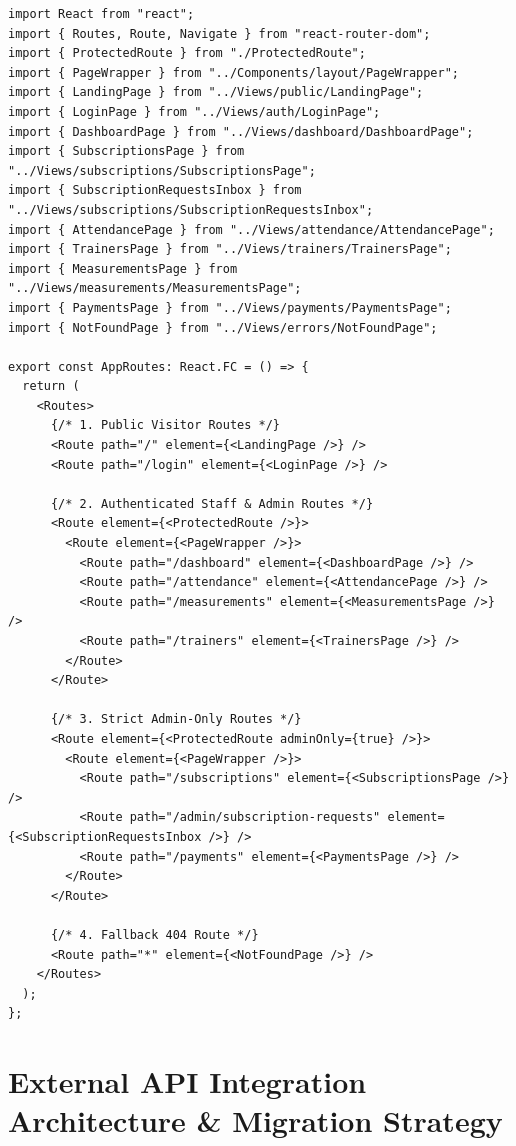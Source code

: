 \documentclass[11pt,a4paper]{article}
\begin{document}
\begin{lstlisting}[caption={Routing/routes.tsx}]
import React from "react";
import { Routes, Route, Navigate } from "react-router-dom";
import { ProtectedRoute } from "./ProtectedRoute";
import { PageWrapper } from "../Components/layout/PageWrapper";
import { LandingPage } from "../Views/public/LandingPage";
import { LoginPage } from "../Views/auth/LoginPage";
import { DashboardPage } from "../Views/dashboard/DashboardPage";
import { SubscriptionsPage } from "../Views/subscriptions/SubscriptionsPage";
import { SubscriptionRequestsInbox } from "../Views/subscriptions/SubscriptionRequestsInbox";
import { AttendancePage } from "../Views/attendance/AttendancePage";
import { TrainersPage } from "../Views/trainers/TrainersPage";
import { MeasurementsPage } from "../Views/measurements/MeasurementsPage";
import { PaymentsPage } from "../Views/payments/PaymentsPage";
import { NotFoundPage } from "../Views/errors/NotFoundPage";

export const AppRoutes: React.FC = () => {
  return (
    <Routes>
      {/* 1. Public Visitor Routes */}
      <Route path="/" element={<LandingPage />} />
      <Route path="/login" element={<LoginPage />} />

      {/* 2. Authenticated Staff & Admin Routes */}
      <Route element={<ProtectedRoute />}>
        <Route element={<PageWrapper />}>
          <Route path="/dashboard" element={<DashboardPage />} />
          <Route path="/attendance" element={<AttendancePage />} />
          <Route path="/measurements" element={<MeasurementsPage />} />
          <Route path="/trainers" element={<TrainersPage />} />
        </Route>
      </Route>

      {/* 3. Strict Admin-Only Routes */}
      <Route element={<ProtectedRoute adminOnly={true} />}>
        <Route element={<PageWrapper />}>
          <Route path="/subscriptions" element={<SubscriptionsPage />} />
          <Route path="/admin/subscription-requests" element={<SubscriptionRequestsInbox />} />
          <Route path="/payments" element={<PaymentsPage />} />
        </Route>
      </Route>

      {/* 4. Fallback 404 Route */}
      <Route path="*" element={<NotFoundPage />} />
    </Routes>
  );
};
\end{lstlisting}

\newpage
\section{External API Integration Architecture \& Migration Strategy}
\end{document}
